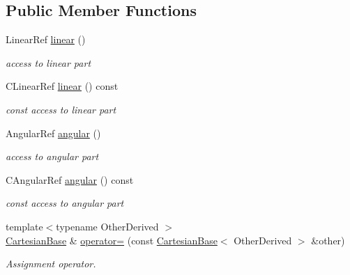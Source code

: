 \subsection*{Public Member Functions}
\begin{DoxyCompactItemize}
\item 
Linear\+Ref \hyperlink{classow__core_1_1CartesianBase_a0d9e6e69ddb78d81e380e41bf3361b38}{linear} ()\hypertarget{classow__core_1_1CartesianBase_a0d9e6e69ddb78d81e380e41bf3361b38}{}\label{classow__core_1_1CartesianBase_a0d9e6e69ddb78d81e380e41bf3361b38}

\begin{DoxyCompactList}\small\item\em access to linear part \end{DoxyCompactList}\item 
C\+Linear\+Ref \hyperlink{classow__core_1_1CartesianBase_aa88680bb3592ead30abda9e73c4c4291}{linear} () const \hypertarget{classow__core_1_1CartesianBase_aa88680bb3592ead30abda9e73c4c4291}{}\label{classow__core_1_1CartesianBase_aa88680bb3592ead30abda9e73c4c4291}

\begin{DoxyCompactList}\small\item\em const access to linear part \end{DoxyCompactList}\item 
Angular\+Ref \hyperlink{classow__core_1_1CartesianBase_a6bc2ef10d99e8fb82146ee194d17e2eb}{angular} ()\hypertarget{classow__core_1_1CartesianBase_a6bc2ef10d99e8fb82146ee194d17e2eb}{}\label{classow__core_1_1CartesianBase_a6bc2ef10d99e8fb82146ee194d17e2eb}

\begin{DoxyCompactList}\small\item\em access to angular part \end{DoxyCompactList}\item 
C\+Angular\+Ref \hyperlink{classow__core_1_1CartesianBase_a31c9ca26fc0c5cd42c79b4f52e95ba9a}{angular} () const \hypertarget{classow__core_1_1CartesianBase_a31c9ca26fc0c5cd42c79b4f52e95ba9a}{}\label{classow__core_1_1CartesianBase_a31c9ca26fc0c5cd42c79b4f52e95ba9a}

\begin{DoxyCompactList}\small\item\em const access to angular part \end{DoxyCompactList}\item 
{\footnotesize template$<$typename Other\+Derived $>$ }\\\hyperlink{classow__core_1_1CartesianBase}{Cartesian\+Base} \& \hyperlink{classow__core_1_1CartesianBase_a8a7447f27431c4f1d7d8dbd1a40b96ec}{operator=} (const \hyperlink{classow__core_1_1CartesianBase}{Cartesian\+Base}$<$ Other\+Derived $>$ \&other)\hypertarget{classow__core_1_1CartesianBase_a8a7447f27431c4f1d7d8dbd1a40b96ec}{}\label{classow__core_1_1CartesianBase_a8a7447f27431c4f1d7d8dbd1a40b96ec}

\begin{DoxyCompactList}\small\item\em Assignment operator. \end{DoxyCompactList}\end{DoxyCompactItemize}


